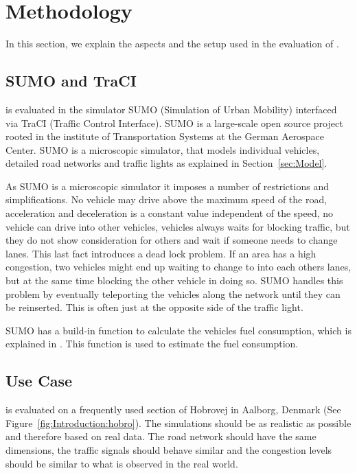 \section{Methodology}\label{sec:methodology}
In this section, we explain the aspects and the setup used in the evaluation of \tech.

\subsection{SUMO and TraCI}\label{sec:methodology:sumo}
\tech is evaluated in the simulator SUMO (Simulation of Urban Mobility)\cite{sumo} interfaced via TraCI (Traffic Control Interface)\cite{traci}.
SUMO is a large-scale open source project rooted in the institute of Transportation Systems at the German Aerospace Center.
SUMO is a microscopic simulator, that models individual vehicles, detailed road networks and traffic lights as explained in Section~\ref{sec:Model}.

As SUMO is a microscopic simulator it imposes a number of restrictions and simplifications.
No vehicle may drive above the maximum speed of the road, acceleration and deceleration is a constant value independent of the speed, no vehicle can drive into other vehicles, vehicles always waits for blocking traffic, but they do not show consideration for others and wait if someone needs to change lanes.
This last fact introduces a dead lock problem.
If an area has a high congestion, two vehicles might end up waiting to change to into each others lanes, but at the same time blocking the other vehicle in doing so. 
SUMO handles this problem by eventually teleporting the vehicles along the network until they can be reinserted. 
This is often just at the opposite side of the traffic light.

SUMO has a build-in function to calculate the vehicles fuel consumption, which is explained in \cite{SUMOFuel}.
This function is used to estimate the fuel consumption.

\subsection{Use Case}\label{sec:UseCase}
\tech is evaluated on a frequently used section of Hobrovej in Aalborg, Denmark (See Figure~\ref{fig:Introduction:hobro}).
The simulations should be as realistic as possible and therefore based on real data. 
The road network should have the same dimensions, the traffic signals should behave similar and the congestion levels should be similar to what is observed in the real world.

